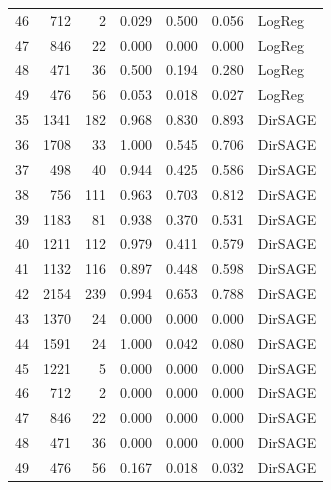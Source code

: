 \begin{tabular}{rrrrrrl}
46 & 712 & 2 & 0.029 & 0.500 & 0.056 & LogReg \\
47 & 846 & 22 & 0.000 & 0.000 & 0.000 & LogReg \\
48 & 471 & 36 & 0.500 & 0.194 & 0.280 & LogReg \\
49 & 476 & 56 & 0.053 & 0.018 & 0.027 & LogReg \\
35 & 1341 & 182 & 0.968 & 0.830 & 0.893 & DirSAGE \\
36 & 1708 & 33 & 1.000 & 0.545 & 0.706 & DirSAGE \\
37 & 498 & 40 & 0.944 & 0.425 & 0.586 & DirSAGE \\
38 & 756 & 111 & 0.963 & 0.703 & 0.812 & DirSAGE \\
39 & 1183 & 81 & 0.938 & 0.370 & 0.531 & DirSAGE \\
40 & 1211 & 112 & 0.979 & 0.411 & 0.579 & DirSAGE \\
41 & 1132 & 116 & 0.897 & 0.448 & 0.598 & DirSAGE \\
42 & 2154 & 239 & 0.994 & 0.653 & 0.788 & DirSAGE \\
43 & 1370 & 24 & 0.000 & 0.000 & 0.000 & DirSAGE \\
44 & 1591 & 24 & 1.000 & 0.042 & 0.080 & DirSAGE \\
45 & 1221 & 5 & 0.000 & 0.000 & 0.000 & DirSAGE \\
46 & 712 & 2 & 0.000 & 0.000 & 0.000 & DirSAGE \\
47 & 846 & 22 & 0.000 & 0.000 & 0.000 & DirSAGE \\
48 & 471 & 36 & 0.000 & 0.000 & 0.000 & DirSAGE \\
49 & 476 & 56 & 0.167 & 0.018 & 0.032 & DirSAGE \\
\bottomrule
\end{tabular}
